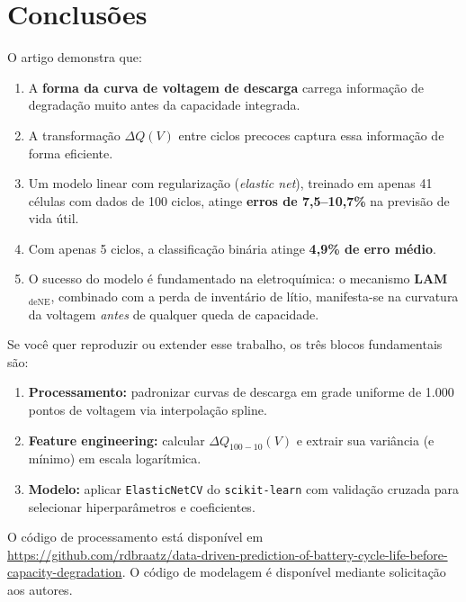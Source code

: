 \documentclass[12pt,a4paper]{article}
\begin{document}
\section{Conclus\~oes}

O artigo demonstra que:

\begin{enumerate}
  \item A \textbf{forma da curva de voltagem de descarga} carrega informa\c{c}\~ao
    de degrada\c{c}\~ao muito antes da capacidade integrada.
  \item A transforma\c{c}\~ao $\Delta Q(V)$ entre ciclos precoces captura essa
    informa\c{c}\~ao de forma eficiente.
  \item Um modelo linear com regulariza\c{c}\~ao (\textit{elastic net}),
    treinado em apenas 41 c\'{e}lulas com dados de 100 ciclos,
    atinge \textbf{erros de 7,5--10,7\%} na previs\~ao de vida \'{u}til.
  \item Com apenas 5 ciclos, a classifica\c{c}\~ao bin\'{a}ria atinge \textbf{4,9\%
    de erro m\'{e}dio}.
  \item O sucesso do modelo \'{e} fundamentado na eletroqu\'{i}mica:
    o mecanismo \textbf{LAM$_\text{deNE}$}, combinado com a perda de invent\'{a}rio
    de l\'{i}tio, manifesta-se na curvatura da voltagem \textit{antes} de qualquer
    queda de capacidade.
\end{enumerate}

\begin{destaque}
Se voc\^{e} quer reproduzir ou extender esse trabalho, os tr\^{e}s blocos fundamentais
s\~ao:
\begin{enumerate}
  \item \textbf{Processamento:} padronizar curvas de descarga em grade uniforme
    de 1.000 pontos de voltagem via interpola\c{c}\~ao spline.
  \item \textbf{Feature engineering:} calcular $\Delta Q_{100-10}(V)$ e extrair
    sua vari\^{a}ncia (e m\'{i}nimo) em escala logar\'{i}tmica.
  \item \textbf{Modelo:} aplicar \texttt{ElasticNetCV} do \texttt{scikit-learn}
    com valida\c{c}\~ao cruzada para selecionar hiperpar\^{a}metros e coeficientes.
\end{enumerate}
O c\'{o}digo de processamento est\'{a} dispon\'{i}vel em
\url{https://github.com/rdbraatz/data-driven-prediction-of-battery-cycle-life-before-capacity-degradation}.
O c\'{o}digo de modelagem \'{e} dispon\'{i}vel mediante solicita\c{c}\~ao aos autores.
\end{destaque}
\end{document}
